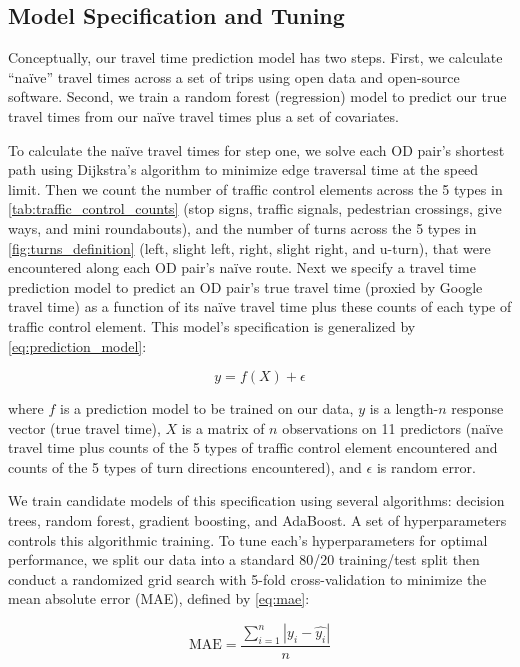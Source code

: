 \documentclass[12pt,letterpaper]{article} %
\begin{document}
\subsection{Model Specification and Tuning}

Conceptually, our travel time prediction model has two steps. First, we calculate \enquote{naïve} travel times across a set of trips using open data and open-source software. Second, we train a random forest (regression) model to predict our true travel times from our naïve travel times plus a set of covariates.

To calculate the naïve travel times for step one, we solve each OD pair's shortest path using Dijkstra's algorithm to minimize edge traversal time at the speed limit. Then we count the number of traffic control elements across the 5 types in \autoref{tab:traffic_control_counts} (stop signs, traffic signals, pedestrian crossings, give ways, and mini roundabouts), and the number of turns across the 5 types in \autoref{fig:turns_definition} (left, slight left, right, slight right, and u-turn), that were encountered along each OD pair's naïve route. Next we specify a travel time prediction model to predict an OD pair's true travel time (proxied by Google travel time) as a function of its naïve travel time plus these counts of each type of traffic control element. This model's specification is generalized by \autoref{eq:prediction_model}:

\begin{equation}
\label{eq:prediction_model}
y = f(X) + \epsilon
\end{equation}

where $f$ is a prediction model to be trained on our data, $y$ is a length-$n$ response vector (true travel time), $X$ is a matrix of $n$ observations on 11 predictors (naïve travel time plus counts of the 5 types of traffic control element encountered and counts of the 5 types of turn directions encountered), and $\epsilon$ is random error.

We train candidate models of this specification using several algorithms: decision trees, random forest, gradient boosting, and AdaBoost. A set of hyperparameters controls this algorithmic training. To tune each's hyperparameters for optimal performance, we split our data into a standard 80/20 training/test split then conduct a randomized grid search with 5-fold cross-validation to minimize the mean absolute error (MAE), defined by \autoref{eq:mae}:

\begin{equation}
\label{eq:mae}
\text{MAE} = \frac{\sum^{n}_{i=1} \left|{y_i - \hat{y_i}}\right|}{n}
\end{equation}
\end{document}
